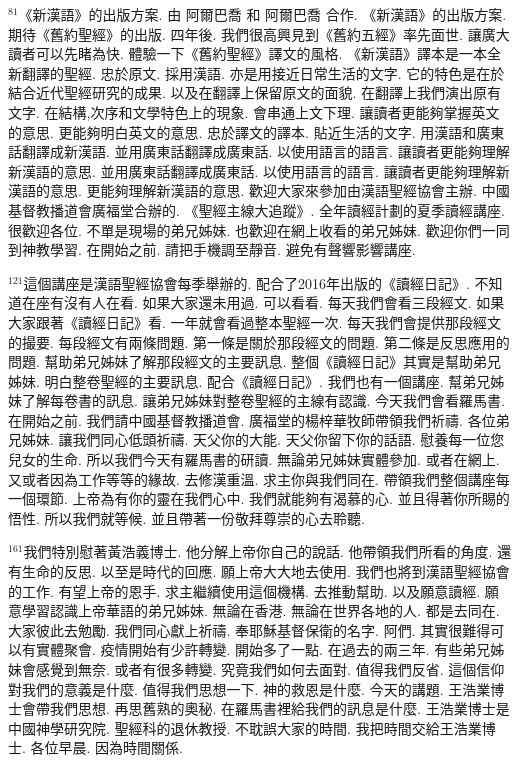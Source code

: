 \documentclass{book}
\begin{document}
$^{81}$《新漢語》的出版方案.
由 阿爾巴喬 和 阿爾巴喬 合作.
《新漢語》的出版方案.
期待《舊約聖經》的出版.
四年後.
我們很高興見到《舊約五經》率先面世.
讓廣大讀者可以先睹為快.
體驗一下《舊約聖經》譯文的風格.
《新漢語》譯本是一本全新翻譯的聖經.
忠於原文.
採用漢語.
亦是用接近日常生活的文字.
它的特色是在於結合近代聖經研究的成果.
以及在翻譯上保留原文的面貌.
在翻譯上我們演出原有文字.
在結構,次序和文學特色上的現象.
會串通上文下理.
讓讀者更能夠掌握英文的意思.
更能夠明白英文的意思.
忠於譯文的譯本.
貼近生活的文字.
用漢語和廣東話翻譯成新漢語.
並用廣東話翻譯成廣東話.
以使用語言的語言.
讓讀者更能夠理解新漢語的意思.
並用廣東話翻譯成廣東話.
以使用語言的語言.
讓讀者更能夠理解新漢語的意思.
更能夠理解新漢語的意思.
歡迎大家來參加由漢語聖經協會主辦.
中國基督教播道會廣福堂合辦的.
《聖經主線大追蹤》.
全年讀經計劃的夏季讀經講座.
很歡迎各位.
不單是現場的弟兄姊妹.
也歡迎在網上收看的弟兄姊妹.
歡迎你們一同到神教學習.
在開始之前.
請把手機調至靜音.
避免有聲響影響講座.

$^{121}$這個講座是漢語聖經協會每季舉辦的.
配合了2016年出版的《讀經日記》.
不知道在座有沒有人在看.
如果大家還未用過.
可以看看.
每天我們會看三段經文.
如果大家跟著《讀經日記》看.
一年就會看過整本聖經一次.
每天我們會提供那段經文的撮要.
每段經文有兩條問題.
第一條是關於那段經文的問題.
第二條是反思應用的問題.
幫助弟兄姊妹了解那段經文的主要訊息.
整個《讀經日記》其實是幫助弟兄姊妹.
明白整卷聖經的主要訊息.
配合《讀經日記》.
我們也有一個講座.
幫弟兄姊妹了解每卷書的訊息.
讓弟兄姊妹對整卷聖經的主線有認識.
今天我們會看羅馬書.
在開始之前.
我們請中國基督教播道會.
廣福堂的楊梓華牧師帶領我們祈禱.
各位弟兄姊妹.
讓我們同心低頭祈禱.
天父你的大能.
天父你留下你的話語.
慰養每一位您兒女的生命.
所以我們今天有羅馬書的研讀.
無論弟兄姊妹實體參加.
或者在網上.
又或者因為工作等等的緣故.
去修漢重溫.
求主你與我們同在.
帶領我們整個講座每一個環節.
上帝為有你的靈在我們心中.
我們就能夠有渴慕的心.
並且得著你所賜的悟性.
所以我們就等候.
並且帶著一份敬拜尊崇的心去聆聽.

$^{161}$我們特別慰著黃浩義博士.
他分解上帝你自己的說話.
他帶領我們所看的角度.
還有生命的反思.
以至是時代的回應.
願上帝大大地去使用.
我們也將到漢語聖經協會的工作.
有望上帝的恩手.
求主繼續使用這個機構.
去推動幫助.
以及願意讀經.
願意學習認識上帝華語的弟兄姊妹.
無論在香港.
無論在世界各地的人.
都是去同在.
大家彼此去勉勵.
我們同心獻上祈禱.
奉耶穌基督保衛的名字.
阿們.
其實很難得可以有實體聚會.
疫情開始有少許轉變.
開始多了一點.
在過去的兩三年.
有些弟兄姊妹會感覺到無奈.
或者有很多轉變.
究竟我們如何去面對.
值得我們反省.
這個信仰對我們的意義是什麼.
值得我們思想一下.
神的救恩是什麼.
今天的講題.
王浩業博士會帶我們思想.
再思舊熟的奧秘.
在羅馬書裡給我們的訊息是什麼.
王浩業博士是中國神學研究院.
聖經科的退休教授.
不耽誤大家的時間.
我把時間交給王浩業博士.
各位早晨.
因為時間關係.
\end{document}
